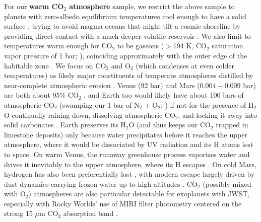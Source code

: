\documentclass[modern,linenumbers,trackchanges]{aastex7}
\begin{document}
For our {\bf warm CO$_2$ atmosphere} sample, we restrict the above sample to planets with zero-albedo equilibrium temperatures cool enough to have a solid surface \citep[$< 1700\mathrm{K}$;][]{boukareDeepTwophaseHemispherical2022}, trying to avoid magma oceans that might tilt a cosmic shoreline by providing direct contact with a much deeper volatile reservoir \citep[see][]{huSecondaryAtmosphereRocky2024}. We also limit to temperatures warm enough for CO$_2$ to be gaseous ($>$194 K, CO$_2$ saturation vapor pressure of 1 bar; \citealt{pierrehumbertPrinciplesPlanetaryClimate2010}), coinciding approximately with the outer edge of the habitable zone \citep[where CO$_2$ can no longer provide greenhouse warming because it condenses out of the atmosphere;][]{kopparapuHabitableZonesMainsequence2013}. We focus on CO$_2$ and O$_2$ (which condenses at even colder temperatures) as likely major constituents of temperate atmospheres distilled by near-complete atmospheric erosion \citep{hamanoEmergenceTwoTypes2013a, lugerExtremeWaterLoss2015, schaeferPredictionsAtmosphericComposition2016c,  krissansen-tottonErosionLargePrimary2024}. Venus (92 bar) and Mars ($0.004-0.009$ bar) are both about 95\% CO$_2$ \citep{loddersPlanetaryScientistsCompanion1998}, and Earth too would likely have about 100 bars of atmospheric CO$_2$ (swamping our 1 bar of N$_2$ + O$_2$; \citealt{ingersollPlanetaryClimates2013}) if not for the presence of H$_2$O continually raining down, dissolving atmospheric CO$_2$, and locking it away into solid carbonates \citep{walkerNegativeFeedbackMechanism1981, lecuyerComparisonCarbonNitrogen2000, wordsworthAtmospheresRockyExoplanets2022, hansenDetectingAtmosphericCO22025}. Earth preserves its H$_2$O (and thus keeps our CO$_2$ trapped in limestone deposits) only because water precipitates before it reaches the upper atmosphere, where it would be dissociated by UV radiation and its H atoms lost to space. On warm Venus, the runaway greenhouse process \citep{komabayasi1ChengFen2XiangXinoDaQiQuantoShuiQuanwoYousuruJiaXiangDenaHuoXinggaYiDingnoTaiYangGuangXiadetoriuruBuLianSoknaPingHengWenDunituite1ChengFen2XiangXinoDaQiQuantoShuiQuanwoYousuruJiaXiangDenaHuoXinggaYiDingnoTaiYangGuangXiadetoriuruBuLianSoknaPingHengWenDunituiteDiscreteEquilibriumTemperatures1967, ingersollRunawayGreenhouseHistory1969} vaporizes water and drives it inevitably to the upper atmosphere, where its H escapes \citep{hamanoEmergenceTwoTypes2013a, leconteIncreasedInsolationThreshold2013, wordsworthWaterLossTerrestrial2013}. On cold Mars, hydrogen has also been preferentially lost \citep{jakoskyLossMartianAtmosphere2018}, with modern escape largely driven by dust dynamics carrying frozen water up to high altitudes \citep{chaffinMartianWaterLoss2021}. CO$_2$ (possibly mixed with O$_2$) atmospheres are also particular detectable for exoplanets with JWST, especially with Rocky Worlds' use of MIRI filter photometry centered on the strong 15 $\mu$m CO$_2$ absorption band \citep{morleyObservingAtmospheresKnown2017b, ihConstrainingThicknessTRAPPIST12023}. 
\end{document}
